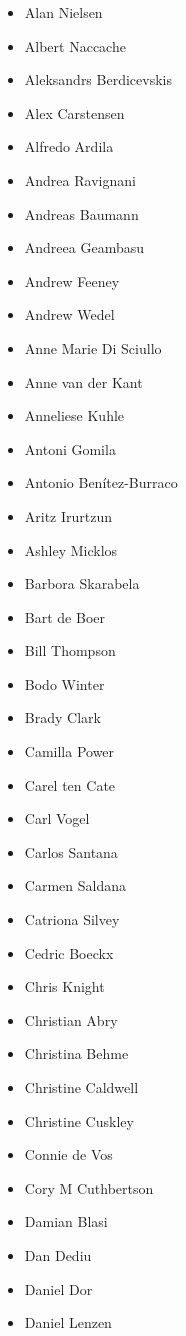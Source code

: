 \begin{multicols}{3}
\begin{itemize}[label={},leftmargin=*]
\item Alan Nielsen
\item Albert Naccache
\item Aleksandrs Berdicevskis
\item Alex Carstensen
\item Alfredo Ardila
\item Andrea Ravignani
\item Andreas Baumann
\item Andreea Geambasu
\item Andrew Feeney
\item Andrew Wedel
\item Anne Marie Di Sciullo
\item Anne van der Kant
\item Anneliese Kuhle
\item Antoni Gomila
\item Antonio Ben\'{i}tez-Burraco
\item Aritz Irurtzun
\item Ashley Micklos
\item Barbora Skarabela
\item Bart de Boer
\item Bill Thompson
\item Bodo Winter
\item Brady Clark
\item Camilla Power
\item Carel ten Cate
\item Carl Vogel
\item Carlos Santana
\item Carmen Saldana
\item Catriona Silvey
\item Cedric Boeckx
\item Chris Knight
\item Christian Abry
\item Christina Behme
\item Christine Caldwell
\item Christine Cuskley
\item Connie de Vos
\item Cory M Cuthbertson
\item Damian Blasi
\item Dan Dediu
\item Daniel Dor
\item Daniel Lenzen

\end{itemize}
\end{multicols}
